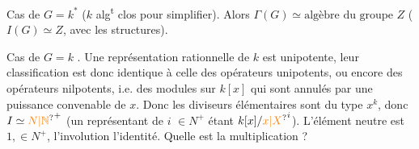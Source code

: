 Cas de $G=k^*$ ($k$ alg\textsuperscript{t} clos pour
simplifier). Alors $\Gamma(G)\simeq\text{algèbre du groupe }Z$
($I(G)\simeq Z$, avec  les structures).

Cas de $G=k$ . Une représentation rationnelle
de $k$ est unipotente, leur classification est donc
identique à celle des opérateurs unipotents,
ou encore des opérateurs nilpotents, i.e.
des modules sur $k[x]$ qui sont
annulés par une puissance convenable de $x$.
Donc les diviseurs élémentaires sont du type
$x^k$, donc $I\simeq {\unsure{N|\mathbb N}}^+$ (un représentant de $i$
 $\in N^+$ étant $k[x]/{\unsure{x|X}}^i$). L'élément
neutre est $1,\in N^+$, l'involution l'identité.
Quelle est la multiplication ?

